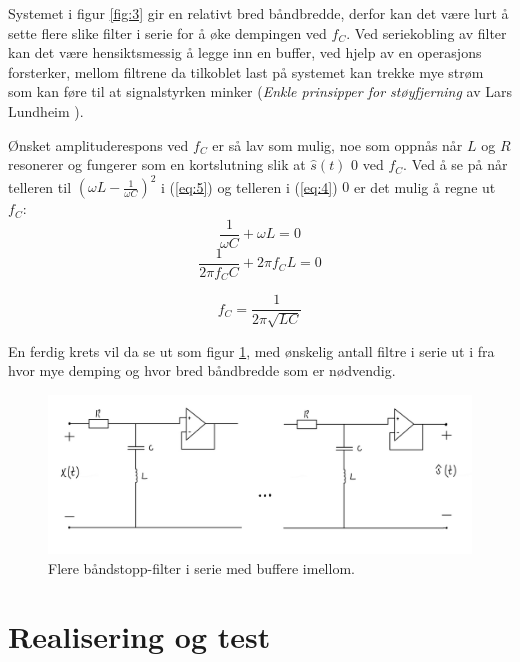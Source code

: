 \documentclass[a4paper,11pt,norsk]{article}
\begin{document}
Systemet i figur \ref{fig:3} gir en relativt bred båndbredde, derfor kan det være lurt å sette flere slike filter i serie for å øke dempingen ved $f_C$. Ved seriekobling av filter kan det være hensiktsmessig å legge inn en buffer, ved hjelp av en operasjons forsterker, mellom filtrene da tilkoblet last på systemet kan trekke mye strøm som kan føre til at signalstyrken minker (\textit{Enkle prinsipper for støyfjerning} av Lars Lundheim \cite{notat}). 

Ønsket amplituderespons ved $f_C$ er så lav som mulig, noe som oppnås når $L$ og $R$ resonerer og fungerer som en kortslutning slik at $\hat{s}(t)$ \xrightarrow $0$ ved $f_C$.
Ved å se på når telleren til $(\omega L - \frac{1}{\omega C})^2$ i (\ref{eq:5}) og telleren i (\ref{eq:4}) \xrightarrow $0$ er det mulig å regne ut $f_C$:
\begin{equation}
    \frac{1}{\omega C} + \omega L = 0
\end{equation}
\begin{equation}
    \frac{1}{2\pi f_C C} + 2 \pi f_C L = 0
\end{equation}

\begin{equation}
        f_C = \frac{1}{2\pi\sqrt{LC}}
        \label{eq:f_c}
\end{equation}

En ferdig krets vil da se ut som figur \ref{fig:4}, med ønskelig antall filtre i serie ut i fra hvor mye demping og hvor bred båndbredde som er nødvendig.

\begin{figure}[H]
  \centering
  \includegraphics[scale=0.2]{D1/Images/IMG_E0539.JPG}
  \caption{Flere båndstopp-filter i serie med buffere imellom.}
  \label{fig:4}
\end{figure}

\section{Realisering og test}
\label{sec:realisering}
\end{document}
